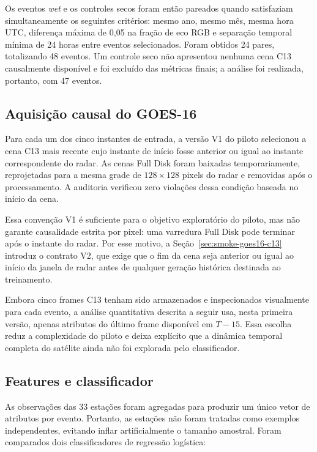 Os eventos \textit{wet} e os controles secos foram então pareados quando satisfaziam simultaneamente os seguintes critérios: mesmo ano, mesmo mês, mesma hora UTC, diferença máxima de 0,05 na fração de eco RGB e separação temporal mínima de 24 horas entre eventos selecionados. Foram obtidos 24 pares, totalizando 48 eventos. Um controle seco não apresentou nenhuma cena C13 causalmente disponível e foi excluído das métricas finais; a análise foi realizada, portanto, com 47 eventos.

\subsection{Aquisição causal do GOES-16}
\label{subsec:aquisicao-causal-goes}

Para cada um dos cinco instantes de entrada, a versão V1 do piloto selecionou a cena C13 mais recente cujo instante de início fosse anterior ou igual ao instante correspondente do radar. As cenas Full Disk foram baixadas temporariamente, reprojetadas para a mesma grade de $128 \times 128$ pixels do radar e removidas após o processamento. A auditoria verificou zero violações dessa condição baseada no início da cena.

Essa convenção V1 é suficiente para o objetivo exploratório do piloto, mas não garante causalidade estrita por pixel: uma varredura Full Disk pode terminar após o instante do radar. Por esse motivo, a Seção~\ref{sec:smoke-goes16-c13} introduz o contrato V2, que exige que o fim da cena seja anterior ou igual ao início da janela de radar antes de qualquer geração histórica destinada ao treinamento.

Embora cinco frames C13 tenham sido armazenados e inspecionados visualmente para cada evento, a análise quantitativa descrita a seguir usa, nesta primeira versão, apenas atributos do último frame disponível em $T-15$. Essa escolha reduz a complexidade do piloto e deixa explícito que a dinâmica temporal completa do satélite ainda não foi explorada pelo classificador.

\subsection{Features e classificador}
\label{subsec:features-classificador-c13}

As observações das 33 estações foram agregadas para produzir um único vetor de atributos por evento. Portanto, as estações não foram tratadas como exemplos independentes, evitando inflar artificialmente o tamanho amostral. Foram comparados dois classificadores de regressão logística:

